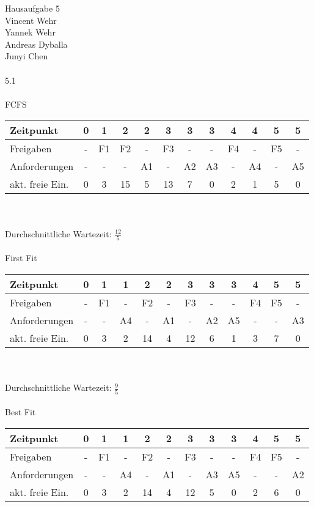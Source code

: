 \documentclass[10pt,a4paper]{scrartcl}
\begin{document}
\Large{Hausaufgabe 5}\\
\normalsize
Vincent Wehr\\
Yannek Wehr\\
Andreas Dyballa\\
Junyi Chen\\
	\\5.1\\\\
	FCFS\\
	\begin{tabularx}{\textwidth}{p{}|c|c|c|c|c|c|c|c|c|c|c}
		\hline
		Zeitpunkt		& 0	& 1	& 2 & 2 & 3 & 3 & 3 & 4 & 4 & 5 & 5\\
		\hline
		Freigaben		& -	& F1 & F2 & - & F3 & - & - & F4 & - & F5 & -\\
		\hline
		Anforderungen	& -	& -	& - & A1 & - & A2 & A3 & - & A4 & - & A5\\
		\hline
		akt. freie Ein.	& 0	& 3	& 15 & 5 & 13 & 7 & 0 & 2 & 1 & 5 & 0\\
	\end{tabularx}\\\\
	Durchschnittliche Wartezeit: $\frac{12}{5}$\\\\
	First Fit\\
	\begin{tabularx}{\textwidth}{p{}|c|c|c|c|c|c|c|c|c|c|c}
		\hline
		Zeitpunkt		& 0	& 1	& 1 & 2 & 2 & 3 & 3 & 3 & 4 & 5 & 5\\
		\hline
		Freigaben		& -	& F1 & - & F2 & - & F3 & - & - & F4 & F5 & -\\
		\hline
		Anforderungen	& -	& -	& A4 & - & A1 & - & A2 & A5 & - & - & A3\\
		\hline
		akt. freie Ein.	& 0	& 3	& 2 & 14 & 4 & 12 & 6 & 1 & 3 & 7 & 0\\
	\end{tabularx}\\\\
	Durchschnittliche Wartezeit: $\frac{9}{5}$\\\\
	Best Fit\\
	\begin{tabularx}{\textwidth}{p{}|c|c|c|c|c|c|c|c|c|c|c}
		\hline
		Zeitpunkt		& 0	& 1	& 1 & 2 & 2 & 3 & 3 & 3 & 4 & 5 & 5\\
		\hline
		Freigaben		& -	& F1 & - & F2 & - & F3 & - & - & F4 & F5 & -\\
		\hline
		Anforderungen	& -	& -	& A4 & - & A1 & - & A3 & A5 & - & - & A2\\
		\hline
		akt. freie Ein.	& 0	& 3	& 2 & 14 & 4 & 12 & 5 & 0 & 2 & 6 & 0\\
	\end{tabularx}\\\\
\end{document}
